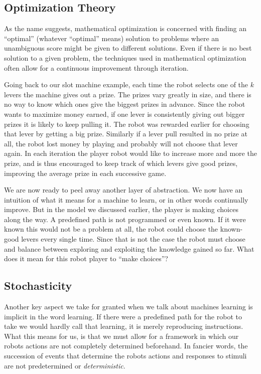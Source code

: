 \subsection{Optimization Theory}
As the name suggests, mathematical optimization is concerned 
with finding an ``optimal'' (whatever ``optimal'' means) 
solution to problems where an unambiguous score might be given 
to different solutions. Even if there is no best solution to a 
given problem, the techniques used in mathematical optimization 
often allow for a continuous improvement through iteration.

Going back to our slot machine example, each time the robot 
selects one of the $k$ levers the machine gives out a prize. 
The prizes vary greatly in size, and there is no way to know 
which ones give the biggest prizes in advance. Since the robot 
wants to maximize money earned, if one lever is consistently 
giving out bigger prizes it is likely to keep pulling it. The 
robot was rewarded earlier for choosing that lever by getting a 
big prize.  Similarly if a lever pull resulted in no prize at 
all, the robot lost money by playing and probably will not 
choose that lever again. In each iteration the player robot 
would like to increase more and more the prize, and is thus  
encouraged to keep track of which levers give good prizes, 
improving the average prize in each successive game.

We are now ready to peel away another layer of abstraction.  We 
now have an intuition of what it means for a machine to learn, 
or in other words continually improve. But in the model we 
discussed earlier, the player is making choices along the way. 
A predefined path is not programmed or even known. If it were 
known this would not be a problem at all, the robot could 
choose the known-good levers every single time. Since that is 
not the case the robot must choose and balance between 
exploring and exploiting the knowledge gained so far. What does 
it mean for this robot player to ``make choices''?

\subsection{Stochasticity}
Another key aspect we take for granted when we talk about 
machines learning is implicit in the word learning. If there 
were a predefined path for the robot to take we would hardly 
call that learning, it is merely reproducing instructions.  
What this means for us, is that we must allow for a framework 
in which our robots actions are not completely determined 
beforehand. In fancier words, the succession of events that 
determine the robots actions and responses to stimuli are not 
predetermined or \textit{deterministic}.

